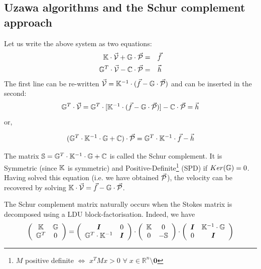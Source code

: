 \subsection{Uzawa algorithms and the Schur complement approach }


Let us write the above system as two equations:
\begin{eqnarray}
{\mathbb{K}} \cdot \vec{\cal V} + {\mathbb{G}} \cdot \vec{\cal P} &=& \vec{f} \\
{\mathbb{G}}^T \cdot  \vec{\cal V} - {\mathbb{C}} \cdot \vec{\cal P} &=& \vec{h} 
\end{eqnarray}
The first line can be re-written 
$\vec{\cal V}={\mathbb{K}}^{-1}\cdot (\vec{f} - {\mathbb{G}} \cdot \vec{\cal P})$ and can be inserted in the second:
\begin{equation}
{\mathbb{G}}^T\cdot \vec{\cal V} ={\mathbb{G}}^T \cdot  [ {\mathbb{K}}^{-1} \cdot  (\vec{f} - {\mathbb{G}} \cdot  \vec{\cal P}) ] - {\mathbb{C}}\cdot \vec{\cal P} = \vec{h} 
\end{equation}
or, 
\begin{mdframed}[backgroundcolor=blue!5]
\begin{equation}
({\mathbb{G}}^T \cdot {\mathbb{K}}^{-1} \cdot {\mathbb{G}} + {\mathbb{C}}) \cdot \vec{\cal P} = {\mathbb{G}}^T \cdot {\mathbb{K}}^{-1}\cdot \vec{f} - \vec{h} 
\end{equation}
\end{mdframed}
The matrix ${\mathbb{S}}= {\mathbb{G}}^T \cdot {\mathbb{K}}^{-1} \cdot {\mathbb{G}} + {\mathbb{C}}$ is called the Schur complement. 
It is Symmetric (since ${\mathbb{K}}$ is symmetric) and  Positive-Definite\footnote{$M$ 
positive definite $\iff$ $x^TMx>0$ $\forall \; x\in \mathbb{R}^n \setminus {\bm 0}$ }
(SPD)  if $Ker({{\mathbb{G}}})=0$. 
Having solved this equation (i.e. we have obtained $\vec{\cal P}$), the velocity can be recovered by solving 
${\mathbb{K}}\cdot \vec{\cal V} =\vec{f}- {\mathbb{G}} \cdot \vec{\cal P}$. 

\begin{remark}
The Schur complement matrix naturally occurs when the Stokes matrix is decomposed using 
a LDU block-factorisation. Indeed, we have 
\[
\left(
\begin{array}{cc}
{\mathbb{K}} & {\mathbb{G}} \\ 
{\mathbb{G}}^T & 0
\end{array}
\right)
=
\left(
\begin{array}{cc}
{\bm I} & 0 \\ 
{\mathbb{G}}^T \cdot {\mathbb{K}}^{-1} & {\bm I}
\end{array}
\right)
\cdot
\left(
\begin{array}{cc}
{\mathbb{K}} & 0 \\ 
0 & -{\mathbb{S}}
\end{array}
\right)
\cdot
\left(
\begin{array}{cc}
{\bm I} & {\mathbb{K}}^{-1} \cdot {\mathbb{G}} \\ 
0 & {\bm I}
\end{array}
\right)
\]
\end{remark}

